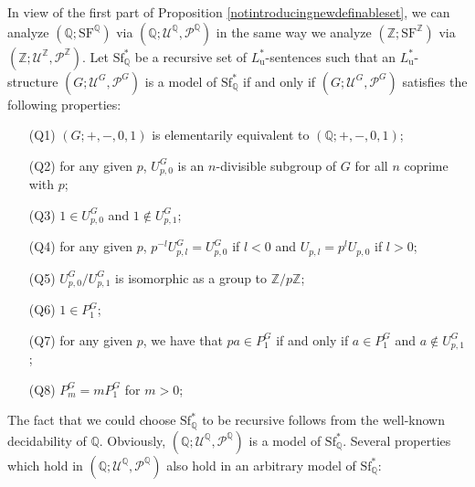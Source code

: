 \documentclass[letterpaper]{amsart}
\newcommand{\qq}{\mathbb{Q}}
\newcommand{\zz}{\mathbb{Z}}
\newcommand{\sU}{\mathscr{U}}
\newcommand{\sP}{\mathscr{P}}
\newcommand{\SF}{\mathrm{SF}^\zz}
\newcommand{\SQ}{\mathrm{SF}^\qq}
\newcommand{\WSFQ}{\mathrm{Sf}^*_{\qq}}
\begin{document}
\noindent In view of the first part of Proposition \ref{notintroducingnewdefinableset}, we can analyze $(\qq; \SQ)$ via $(\qq; \sU^\qq, \sP^\qq)$  in the same way we analyze $(\zz; \SF)$ via $(\zz; \sU^\zz, \sP^\zz)$. 
Let $\WSFQ$ be a recursive set of $L_\mathrm{u}^*$-sentences such that an $L_\mathrm{u}^*$-structure $(G; \sU^G, \sP^G)$ is a model of $\WSFQ$ if and only if $(G; \sU^G, \sP^G)$  satisfies the following properties:
\begin{enumerate}
\item[(Q1)] $(G;+,-,0,1)$ is elementarily equivalent to $(\qq;+,-,0,1)$; 
\item[(Q2)] for any given $p$, $U_{p,0}^G$ is an $n$-divisible subgroup of $G$ for all  $n$ coprime  with $p$;
\item[(Q3)] $1\in U_{p,0}^G$ and $1 \notin U_{p,1}^G$;
\item[(Q4)] for any given $p$, $p^{-l}U_{p,l}^G = U_{p, 0}^G$ if $l<0$  and $U_{p,l} = p^l U_{p, 0}$ if $l>0$;
\item [(Q5)]$ U_{p, 0}^G \slash U_{p, 1}^G$ is isomorphic as a group to $\zz \slash p\zz$; 
\item[(Q6)] $1 \in P_1^G$;
\item[(Q7)] for any given $p$, we have that $pa \in P_1^G$ if and only if $a\in P_1^G$ and $a \notin U_{p,1}^G$;
\item [(Q8)]$P_m^G = m P_1^G$ for $m>0$;
\end{enumerate}

\noindent The fact that we could choose $\WSFQ$ to be recursive follows from the well-known decidability of $\qq$. Obviously, $(\qq; \sU^\qq, \sP^\qq)$ is a  model of $\WSFQ$. 
Several properties which hold in $(\qq; \sU^\qq, \sP^\qq)$ also hold in an arbitrary model of $\WSFQ$:
 
\end{document}
